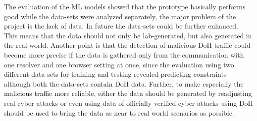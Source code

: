 The evaluation of the ML models showed that the prototype basically performs good while the data-sets were analyzed separately, the major problem of the project is the lack of data. In future the data-sets could be further enhanced. This means that the data should not only be lab-generated, but also generated in the real world. Another point is that the detection of malicious DoH traffic could become more precise if the data is gathered only from the communication with one resolver and one browser setting at once, since the evaluation using two different data-sets for training and testing revealed predicting constraints although both the data-sets contain DoH data. Further, to make especially the malicious traffic more reliable, either the data should be generated by readjusting real cyber-attacks or even using data of officially verified cyber-attacks using DoH should be used to bring the data as near to real world scenarios as possible.
